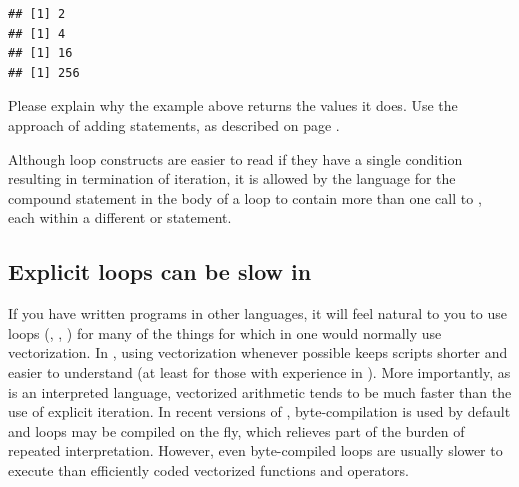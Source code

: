 \documentclass[krantz2]{krantz}\usepackage{knitr}
\begin{document}
\begin{knitrout}\footnotesize
{}\color{fgcolor}\begin{kframe}
\begin{alltt}
 \hlkwb{<-} 
\hlstd{\{}
    \hlopt{>} \hlstd{)} \hlstd{()}
   \hlkwb{<-} \hlopt{^}
\hlstd{\}}
\end{alltt}
\begin{verbatim}
## [1] 2
## [1] 4
## [1] 16
## [1] 256
\end{verbatim}
\end{kframe}
\end{knitrout}

\begin{playground}
Please explain why the example above returns the values it does. Use the approach of adding  statements, as described on page \pageref{box:play:forloop}.
\end{playground}

\begin{explainbox}
Although  loop constructs are easier to read if they have a single condition resulting in termination of iteration, it is allowed by the \Rlang language for the compound statement in the body of a loop to contain more than one call to , each within a different  or  statement.
\end{explainbox}

\subsection{Explicit loops can be slow in \Rlang}\label{sec:loops:slow}
If you have written programs in other languages, it will feel natural to you to use loops (, , ) for many of the things for which in \Rlang one would normally use vectorization. In \Rlang, using vectorization whenever possible keeps scripts shorter and easier to understand (at least for those with experience in \Rlang). More importantly, as \Rlang is an interpreted language, vectorized arithmetic tends to be much faster than the use of explicit iteration. In recent versions of \Rpgrm, byte-compilation is used by default and loops may be compiled on the fly, which relieves part of the burden of repeated interpretation. However, even byte-compiled loops are usually slower to execute than efficiently coded vectorized functions and operators.
\end{document}
